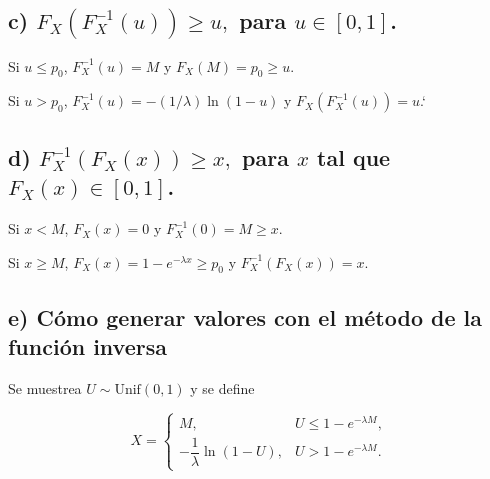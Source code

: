 \documentclass[10pt,a4paper]{article}
\begin{document}
    \begin{center}
    \end{center}
    { \hspace*{\fill} \\}
    
    \hypertarget{c-f_xf-1_xu-geq-u-para-u-in-0-1.}{%
\subsection{\texorpdfstring{c) \(F_X(F^{-1}_X(u)) \geq u,\) para
\(u \in [0, 1]\).}{c) F\_X(F\^{}\{-1\}\_X(u)) \textbackslash geq u, para u \textbackslash in {[}0, 1{]}.}}\label{c-f_xf-1_xu-geq-u-para-u-in-0-1.}}

    Si \(u\le p_0\), \(F_X^{-1}(u)=M\) y \(F_X(M)=p_0\ge u\).

Si \(u>p_0\), \(F_X^{-1}(u)=-(1/\lambda)\ln(1-u)\) y
\(F_X(F_X^{-1}(u))=u\).`

    \hypertarget{d-f-1_xf_xx-geq-x-para-x-tal-que-f_xx-in-0-1.}{%
\subsection{\texorpdfstring{d) \(F^{-1}_X(F_X(x)) \geq x,\) para \(x\)
tal que
\(F_X(x) \in [0, 1]\).}{d) F\^{}\{-1\}\_X(F\_X(x)) \textbackslash geq x, para x tal que F\_X(x) \textbackslash in {[}0, 1{]}.}}\label{d-f-1_xf_xx-geq-x-para-x-tal-que-f_xx-in-0-1.}}

    Si \(x<M\), \(F_X(x)=0\) y \(F_X^{-1}(0)=M\ge x\).

Si \(x\ge M\), \(F_X(x)=1-e^{-\lambda x}\ge p_0\) y
\(F_X^{-1}(F_X(x))=x\).

    \hypertarget{e-cuxf3mo-generar-valores-con-el-muxe9todo-de-la-funciuxf3n-inversa}{%
\subsection{e) Cómo generar valores con el método de la función
inversa}\label{e-cuxf3mo-generar-valores-con-el-muxe9todo-de-la-funciuxf3n-inversa}}

    Se muestrea \(U\sim\mathrm{Unif}(0,1)\) y se define

\[
X=\begin{cases}
M,& U\le 1-e^{-\lambda M},\\[6pt]
-\dfrac{1}{\lambda}\ln(1-U),& U>1-e^{-\lambda M}.
\end{cases}
\]
\end{document}
